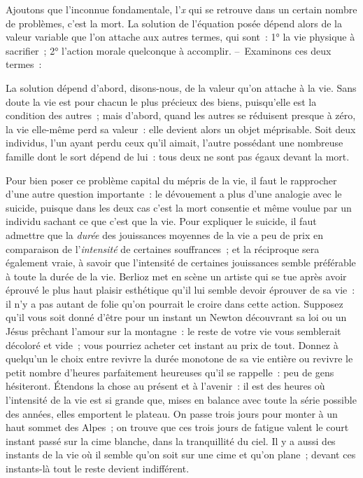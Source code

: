 \documentclass[french,twoside]{book} %
\begin{document}
Ajoutons que l’inconnue fondamentale, l’\emph{x} qui se retrouve dans un certain nombre de problèmes, c’est la mort. La solution de l’équation posée dépend alors de la valeur variable que l’on attache aux autres termes, qui sont : 1° la vie physique à sacrifier ; 2° l’action morale quelconque à accomplir. – Examinons ces deux termes :\par
La solution dépend d’abord, disons-nous, de la valeur qu’on attache à la vie. Sans doute la vie est pour chacun le plus précieux des biens, puisqu’elle est la condition des autres ; mais d’abord, quand les autres se réduisent presque à zéro, la vie elle-même perd sa valeur : elle devient alors un objet méprisable. Soit deux individus, l’un ayant perdu ceux qu’il aimait, l’autre possédant une nombreuse famille dont le sort dépend de lui : tous deux ne sont pas égaux devant la mort.\par
Pour bien poser ce problème capital du mépris de la vie, il faut le rapprocher d’une autre question importante : le dévouement a plus d’une analogie avec le suicide, puisque dans les deux cas c’est la mort consentie et même voulue par un individu sachant ce que c’est que la vie. Pour expliquer le suicide, il faut admettre que la \emph{durée} des jouissances moyennes de la vie a peu de prix en comparaison de l’\emph{intensité} de certaines souffrances ; et la réciproque sera également vraie, à savoir que l’intensité de certaines jouissances semble préférable à toute la durée de la vie. Berlioz met en scène un artiste qui se tue après avoir éprouvé le plus haut plaisir esthétique qu’il lui semble devoir éprouver de sa vie : il n’y a pas autant de folie qu’on pourrait le croire dans cette action. Supposez qu’il vous soit donné d’être pour un instant un Newton découvrant sa loi ou un Jésus prêchant l’amour sur la montagne : le reste de votre vie vous semblerait décoloré et vide ; vous pourriez acheter cet instant au prix de tout. Donnez à quelqu’un le choix entre revivre la durée monotone de sa vie entière ou revivre le petit nombre d’heures parfaitement heureuses qu’il se rappelle : peu de gens hésiteront. Étendons la chose au présent et à l’avenir : il est des heures où l’intensité de la vie est si grande que, mises en balance avec toute la série possible des années, elles emportent le plateau. On passe trois jours pour monter à un haut sommet des Alpes ; on trouve que ces trois jours de fatigue valent le court instant passé sur la cime blanche, dans la tranquillité du ciel. Il y a aussi des instants de la vie où il semble qu’on soit sur une cime et qu’on plane ; devant ces instants-là tout le reste devient indifférent.\par
\end{document}
